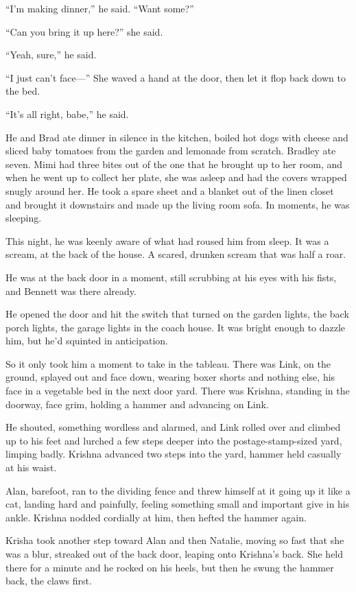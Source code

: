 \documentclass{article}
\begin{document}
``I'm making dinner,'' he said.  ``Want some?''

``Can you bring it up here?'' she said.

``Yeah, sure,'' he said. 

``I just can't face---'' She waved a hand at the door, then let it
flop back down to the bed.

``It's all right, babe,'' he said.

He and Brad ate dinner in silence in the kitchen, boiled hot dogs with
cheese and sliced baby tomatoes from the garden and lemonade from
scratch.  Bradley ate seven.  Mimi had three bites out of the one that
he brought up to her room, and when he went up to collect her plate,
she was asleep and had the covers wrapped snugly around her.  He took
a spare sheet and a blanket out of the linen closet and brought it
downstairs and made up the living room sofa.  In moments, he was
sleeping.

This night, he was keenly aware of what had roused him from sleep.  It
was a scream, at the back of the house.  A scared, drunken scream that
was half a roar.

He was at the back door in a moment, still scrubbing at his eyes with
his fists, and Bennett was there already. 

He opened the door and hit the switch that turned on the garden
lights, the back porch lights, the garage lights in the coach house. 
It was bright enough to dazzle him, but he'd squinted in anticipation.

So it only took him a moment to take in the tableau.  There was Link,
on the ground, splayed out and face down, wearing boxer shorts and
nothing else, his face in a vegetable bed in the next door yard. 
There was Krishna, standing in the doorway, face grim, holding a
hammer and advancing on Link.

He shouted, something wordless and alarmed, and Link rolled over and
climbed up to his feet and lurched a few steps deeper into the
postage-stamp-sized yard, limping badly.  Krishna advanced two steps
into the yard, hammer held casually at his waist.

Alan, barefoot, ran to the dividing fence and threw himself at it
going up it like a cat, landing hard and painfully, feeling something
small and important give in his ankle.  Krishna nodded cordially at
him, then hefted the hammer again.

Krisha took another step toward Alan and then Natalie, moving so fast
that she was a blur, streaked out of the back door, leaping onto
Krishna's back.  She held there for a minute and he rocked on his
heels, but then he swung the hammer back, the claws first. 
\end{document}
